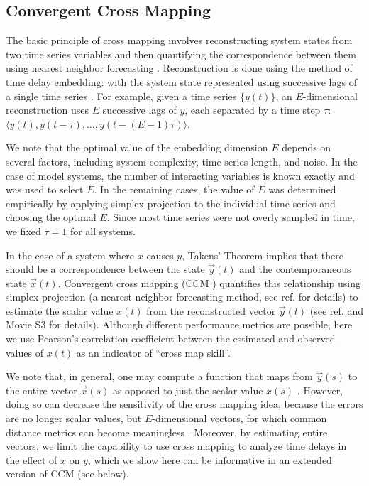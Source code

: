 \subsection{Convergent Cross Mapping}

The basic principle of cross mapping involves reconstructing system states from two time series variables and then quantifying the correspondence between them using nearest neighbor forecasting \cite{Sugihara_1990}. Reconstruction is done using the method of time delay embedding: with the system state represented using successive lags of a single time series \cite{Takens_1981, Packard_1980}. For example, given a time series $\{y(t)\}$, an $E$-dimensional reconstruction uses $E$ successive lags of $y$, each separated by a time step $\tau$: $\langle y(t), y(t-\tau), \dots, y(t - (E-1)\tau) \rangle$.

We note that the optimal value of the embedding dimension $E$ depends on several factors, including system complexity, time series length, and noise. In the case of model systems, the number of interacting variables is known exactly and was used to select $E$. In the remaining cases, the value of $E$ was determined empirically by applying simplex projection \cite{Sugihara_1990} to the individual time series and choosing the optimal $E$. Since most time series were not overly sampled in time, we fixed $\tau = 1$ for all systems. 

In the case of a system where $x$ causes $y$, Takens' Theorem \cite{Takens_1981} implies that there should be a correspondence between the state $\vec{y}(t)$ and the contemporaneous state $\vec{x}(t)$. Convergent cross mapping (CCM \cite{Sugihara_2012}) quantifies this relationship using simplex projection (a nearest-neighbor forecasting method, see ref. \cite{Sugihara_1990} for details) to estimate the scalar value $x(t)$ from the reconstructed vector $\vec{y}(t)$ (see ref. \cite{Sugihara_2012} and Movie S3 for details). Although different performance metrics are possible, here we use Pearson's correlation coefficient between the estimated and observed values of $x(t)$ as an indicator of ``cross map skill''.

We note that, in general, one may compute a function that maps from $\vec{y}(s)$ to the entire vector $\vec{x}(s)$ as opposed to just the scalar value $x(s)$ \cite{Schiff_1996, Ma_2014}. However, doing so can decrease the sensitivity of the cross mapping idea, because the errors are no longer scalar values, but $E$-dimensional vectors, for which common distance metrics can become meaningless \cite{Aggarwal_2001}. Moreover, by estimating entire vectors, we limit the capability to use cross mapping to analyze time delays in the effect of $x$ on $y$, which we show here can be informative in an extended version of CCM (see below).

